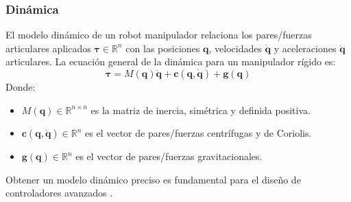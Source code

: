 \documentclass[12pt]{article}
\begin{document}
\subsubsection{Dinámica}
\label{sssec:dinamica_robots}
El modelo dinámico de un robot manipulador relaciona los pares/fuerzas articulares aplicados $\bm{\tau} \in \mathbb{R}^n$ con las posiciones $\bm{q}$, velocidades $\dot{\bm{q}}$ y aceleraciones $\ddot{\bm{q}}$ articulares. La ecuación general de la dinámica para un manipulador rígido es:
\begin{equation}
\bm{\tau} = M(\bm{q})\ddot{\bm{q}} + \bm{c}(\bm{q},\dot{\bm{q}}) + \bm{g}(\bm{q})
\label{eq:dinamica_robot}
\end{equation}
Donde:
\begin{itemize}
    \item $M(\bm{q}) \in \mathbb{R}^{n \times n}$ es la matriz de inercia, simétrica y definida positiva.
    \item $\bm{c}(\bm{q},\dot{\bm{q}}) \in \mathbb{R}^n$ es el vector de pares/fuerzas centrífugas y de Coriolis.
    \item $\bm{g}(\bm{q}) \in \mathbb{R}^n$ es el vector de pares/fuerzas gravitacionales.
\end{itemize}
Obtener un modelo dinámico preciso es fundamental para el diseño de controladores avanzados \cite{modern_robotics}.
\end{document}
